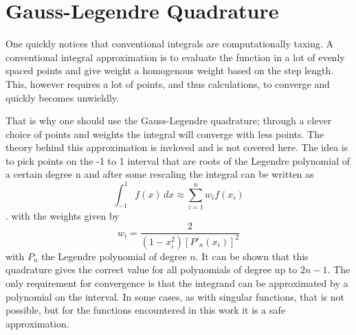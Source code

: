 \documentclass[../main/report.tex]{subfiles}
\begin{document}
\section{Gauss-Legendre Quadrature}
\label{app:gauss-legendre}

One quickly notices that conventional integrals are computationally taxing. 
A conventional integral approximation is to evaluate the function in a lot of evenly spaced points and give weight a homogenous weight based on the step length. 
This, however requires a lot of points, and thus calculations, to converge and quickly becomes unwieldly. 

That is why one should use the Gauss-Legendre quadrature; through a clever choice of points and weights the integral will converge with less points. 
The theory behind this approximation is invloved \cite{abramowitz+stegun} and is not covered here. 
The idea is to pick points on the -1 to 1 interval that are roots of the Legendre polynomial of a certain degree n and after some rescaling the integral can be written as
\[
\int_{-1}^1 f(x)\,dx \approx \sum_{i=1}^n w_i f(x_i)
\].
with the weights given by
\[ 
w_i = \frac{2}{\left( 1-x_i^2 \right) [P'_n(x_i)]^2}
\] 
with $P_n$ the Legendre polynomial of degree $n$.
It can be shown that this quadrature gives the correct value for all polynomials of degree up to $2n-1$. 
The only requirement for convergence is that the integrand can be approximated by a polynomial on the interval.
In some cases, as with singular functions, that is not possible, but for the functions encountered in this work it is a safe approximation.
\end{document}
